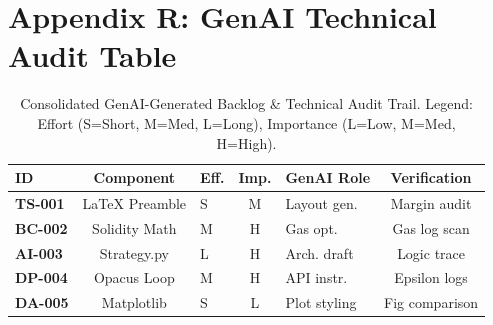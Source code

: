\documentclass[10pt, a4paper, twocolumn]{article}
\begin{document}
\section*{Appendix R: GenAI Technical Audit Table}
\begin{table}[hbt!]
\centering
\scriptsize
\begin{tabular}{lcp{1.2cm}cp{1.4cm}c}
\toprule
\textbf{ID} & \textbf{Component} & \textbf{Eff.} & \textbf{Imp.} & \textbf{GenAI Role} & \textbf{Verification} \\
\midrule
\textbf{TS-001} & LaTeX Preamble & S & M & Layout gen. & Margin audit \\
\textbf{BC-002} & Solidity Math & M & H & Gas opt. & Gas log scan \\
\textbf{AI-003} & Strategy.py & L & H & Arch. draft & Logic trace \\
\textbf{DP-004} & Opacus Loop & M & H & API instr. & Epsilon logs \\
\textbf{DA-005} & Matplotlib & S & L & Plot styling & Fig comparison \\
\bottomrule
\end{tabular}
\caption{Consolidated GenAI-Generated Backlog \& Technical Audit Trail. Legend: Effort (S=Short, M=Med, L=Long), Importance (L=Low, M=Med, H=High).}
\end{table}
\end{document}
